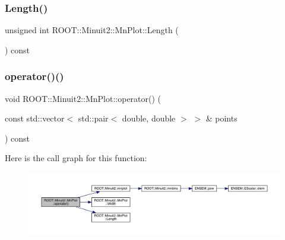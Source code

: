 \subsubsection{\texorpdfstring{Length()}{Length()}\hspace{0.1cm}{\footnotesize\ttfamily [2/2]}}
{\footnotesize\ttfamily unsigned int R\+O\+O\+T\+::\+Minuit2\+::\+Mn\+Plot\+::\+Length (\begin{DoxyParamCaption}{ }\end{DoxyParamCaption}) const\hspace{0.3cm}{\ttfamily [inline]}}

\mbox{\label{classROOT_1_1Minuit2_1_1MnPlot_a118857899dee9d8222acc5c4926956ca}} 
\subsubsection{\texorpdfstring{operator()()}{operator()()}\hspace{0.1cm}{\footnotesize\ttfamily [1/4]}}
{\footnotesize\ttfamily void R\+O\+O\+T\+::\+Minuit2\+::\+Mn\+Plot\+::operator() (\begin{DoxyParamCaption}\item[{const std\+::vector$<$ std\+::pair$<$ double, double $>$ $>$ \&}]{points }\end{DoxyParamCaption}) const}

Here is the call graph for this function\+:\nopagebreak
\begin{figure}[H]
\begin{center}
\leavevmode
\includegraphics[width=350pt]{d1/d62/classROOT_1_1Minuit2_1_1MnPlot_a118857899dee9d8222acc5c4926956ca_cgraph}
\end{center}
\end{figure}
\mbox{\label{classROOT_1_1Minuit2_1_1MnPlot_a118857899dee9d8222acc5c4926956ca}} 
